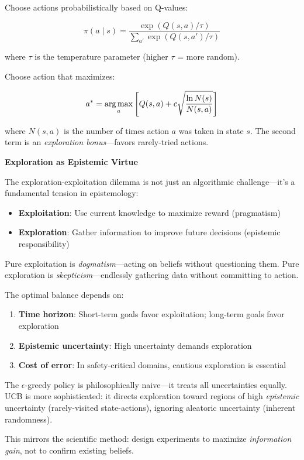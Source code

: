 \begin{definition}
Choose actions probabilistically based on Q-values:

\begin{equation}
    \pi(a \mid s) = \frac{\exp(Q(s, a) / \tau)}{\sum_{a'} \exp(Q(s, a') / \tau)}
\end{equation}

where $\tau$ is the temperature parameter (higher $\tau$ = more random).
\end{definition}

\begin{definition}
Choose action that maximizes:

\begin{equation}
    a^* = \operatorname*{arg\,max}_a \left[ Q(s, a) + c \sqrt{\frac{\ln N(s)}{N(s, a)}} \right]
\end{equation}

where $N(s, a)$ is the number of times action $a$ was taken in state $s$. The second term is an \textit{exploration bonus}---favors rarely-tried actions.
\end{definition}

\begin{philobox}
\textbf{Exploration as Epistemic Virtue}

The exploration-exploitation dilemma is not just an algorithmic challenge---it's a fundamental tension in epistemology:

\begin{itemize}
    \item \textbf{Exploitation}: Use current knowledge to maximize reward (pragmatism)
    \item \textbf{Exploration}: Gather information to improve future decisions (epistemic responsibility)
\end{itemize}

Pure exploitation is \textit{dogmatism}---acting on beliefs without questioning them. Pure exploration is \textit{skepticism}---endlessly gathering data without committing to action.

The optimal balance depends on:
\begin{enumerate}
    \item \textbf{Time horizon}: Short-term goals favor exploitation; long-term goals favor exploration
    \item \textbf{Epistemic uncertainty}: High uncertainty demands exploration
    \item \textbf{Cost of error}: In safety-critical domains, cautious exploration is essential
\end{enumerate}

The $\epsilon$-greedy policy is philosophically naive---it treats all uncertainties equally. UCB is more sophisticated: it directs exploration toward regions of high \textit{epistemic} uncertainty (rarely-visited state-actions), ignoring aleatoric uncertainty (inherent randomness).

This mirrors the scientific method: design experiments to maximize \textit{information gain}, not to confirm existing beliefs.
\end{philobox}

